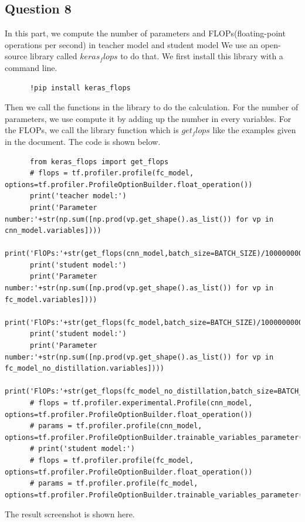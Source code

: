 \documentclass[conference]{IEEEtran}
\begin{document}
  \subsection{Question 8}
  In this part, we compute the number of parameters and FLOPs(floating-point operations per second) in teacher model and student model
  We use an open-source library called $keras_flops$ to do that. We first install this library with a command line.
  \begin{lstlisting}
      !pip install keras_flops
  \end{lstlisting}
  Then we call the functions in the library to do the calculation. For the number of parameters, we use compute it by adding up the number in every variables.
  For the FLOPs, we call the library function which is $get_flops$ like the examples given in the document.
  The code is shown below.
  \begin{lstlisting}
      from keras_flops import get_flops
      # flops = tf.profiler.profile(fc_model, options=tf.profiler.ProfileOptionBuilder.float_operation())
      print('teacher model:')
      print('Parameter number:'+str(np.sum([np.prod(vp.get_shape().as_list()) for vp in cnn_model.variables])))
      print('FlOPs:'+str(get_flops(cnn_model,batch_size=BATCH_SIZE)/1000000000.0))
      print('student model:')
      print('Parameter number:'+str(np.sum([np.prod(vp.get_shape().as_list()) for vp in fc_model.variables])))
      print('FlOPs:'+str(get_flops(fc_model,batch_size=BATCH_SIZE)/1000000000.0))
      print('student model:')
      print('Parameter number:'+str(np.sum([np.prod(vp.get_shape().as_list()) for vp in fc_model_no_distillation.variables])))
      print('FlOPs:'+str(get_flops(fc_model_no_distillation,batch_size=BATCH_SIZE)/1000000000.0))
      # flops = tf.profiler.experimental.Profile(cnn_model, options=tf.profiler.ProfileOptionBuilder.float_operation())
      # params = tf.profiler.profile(cnn_model, options=tf.profiler.ProfileOptionBuilder.trainable_variables_parameter())
      # print('student model:')
      # flops = tf.profiler.profile(fc_model, options=tf.profiler.ProfileOptionBuilder.float_operation())
      # params = tf.profiler.profile(fc_model, options=tf.profiler.ProfileOptionBuilder.trainable_variables_parameter())
  \end{lstlisting}
  The result screenshot is shown here.
  
\end{document}
